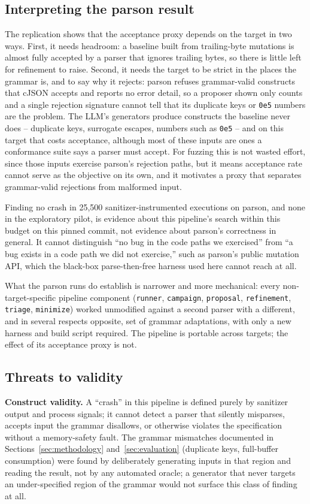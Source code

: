 \subsection{Interpreting the parson result}
The replication shows that the acceptance proxy depends on the target in two
ways. First, it needs headroom: a baseline built from trailing-byte mutations
is almost fully accepted by a parser that ignores trailing bytes, so there is
little left for refinement to raise. Second, it needs the target to be strict
in the places the grammar is, and to say why it rejects: parson refuses
grammar-valid constructs that cJSON accepts and reports no error detail, so a
proposer shown only counts and a single rejection signature cannot tell that
its duplicate keys or \texttt{0e5} numbers are the problem. The LLM's
generators produce constructs the baseline never does -- duplicate keys,
surrogate escapes, numbers such as \texttt{0e5} -- and on this target that
costs acceptance, although most of these inputs are ones a conformance suite
says a parser must accept. For
fuzzing this is not wasted effort, since those inputs exercise parson's
rejection paths, but it means acceptance rate cannot serve as the objective
on its own, and it motivates a proxy that separates grammar-valid rejections
from malformed input.

Finding no crash in 25{,}500 sanitizer-instrumented executions on parson, and
none in the exploratory pilot, is evidence about this pipeline's search within
this budget on this pinned commit, not evidence about parson's correctness in
general. It cannot distinguish ``no bug in the code paths we exercised'' from
``a bug exists in a code path we did not exercise,'' such as parson's public
mutation API, which the black-box parse-then-free harness used here cannot
reach at all.

What the parson runs do establish is narrower and more mechanical: every
non-target-specific pipeline component (\texttt{runner}, \texttt{campaign},
\texttt{proposal}, \texttt{refinement}, \texttt{triage}, \texttt{minimize})
worked unmodified against a second parser with a different, and in several
respects opposite, set of grammar adaptations, with only a new harness and
build script required. The pipeline is portable across targets; the effect
of its acceptance proxy is not.

\subsection{Threats to validity}
\textbf{Construct validity.} A ``crash'' in this pipeline is defined purely
by sanitizer output and process signals; it cannot detect a parser that
silently misparses, accepts input the grammar disallows, or otherwise
violates the specification without a memory-safety fault. The grammar
mismatches documented in Sections~\ref{sec:methodology}
and~\ref{sec:evaluation} (duplicate keys, full-buffer consumption) were
found by deliberately generating inputs in that region and reading the
result, not by any automated oracle; a generator that never targets an
under-specified region of the grammar would not surface this class of
finding at all.

